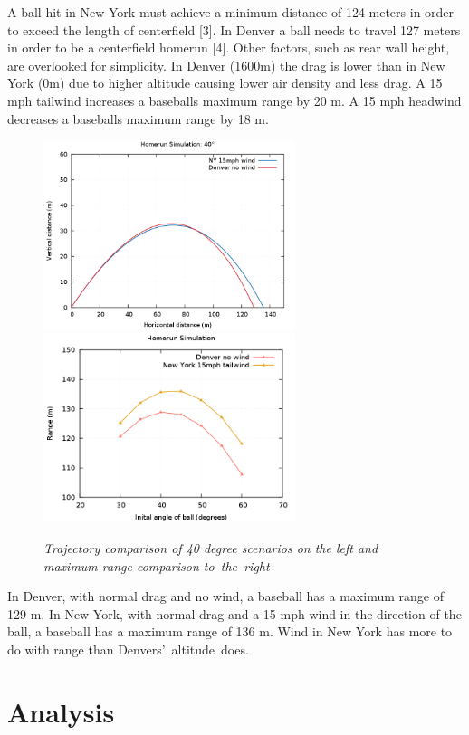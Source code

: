 \documentclass[11pt]{article}
\begin{document}
A ball hit in New York must achieve a minimum distance of 124 meters in order to exceed the length of centerfield [3].  
In Denver a ball needs to travel 127 meters in order to be a centerfield homerun [4].  Other factors, such as rear wall height, 
are overlooked for simplicity.  In Denver (1600m) the drag is lower than in New York (0m) due to higher altitude causing lower 
air density and less drag.  A 15 mph tailwind increases a baseballs maximum range by 20 m.  A 15 mph headwind decreases a 
baseballs maximum range by 18 m.
\begin{figure}[H]
  \begin{center}
 \centerline{\includegraphics[width=2.9in]{finalplot2.png}\includegraphics[width=2.9in]{finalplot.png}}
\caption{\it \small{Trajectory comparison of 40 degree scenarios on the left and maximum range comparison to~the~right \label{fig5}}}
  \end{center}
\end{figure}
In Denver, with normal drag and no wind, a baseball has a maximum range of 129 m.  In New York, with normal drag and a 
15 mph wind in the direction of the ball, a baseball has a maximum range of 136 m.  Wind in New York has more to do with range 
than Denvers'~altitude~does.



\section{Analysis}
\end{document}
